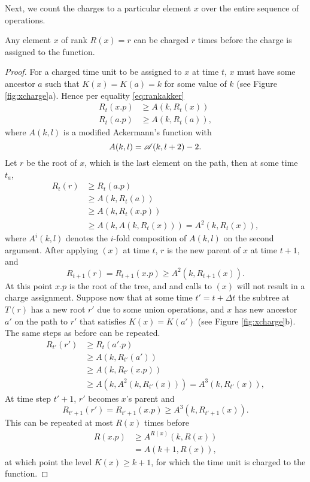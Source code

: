 Next, we count the charges to a particular element $x$ over the entire sequence of operations. 
\begin{lemma}\label{lem:xcharge}
  Any element $x$ of rank $R(x) = r$ can be charged $r$ times before the charge is assigned to the  function.
\end{lemma}
\begin{proof}
  For a charged time unit to be assigned to $x$ at time $t$, $x$ must have some ancestor $a$ such that $K(x) = K(a) = k$ for some value of $k$ (see Figure \ref{fig:xcharge}a). Hence per equality \ref{eq:rankakker}
  \begin{align*}
    R_{t}(x.p) & \geq A(k,R_{t}(x))\\
    R_{t}(a.p) & \geq A(k,R_{t}(a)),
  \end{align*}
  where $A(k,l)$ is a modified Ackermann's function with 
  \begin{equation*}
    A(k,l) = \mathscr{A}(k,l+2)-2.
  \end{equation*}
  Let $r$ be the root of $x$, which is the last element on the path, then at some time $t_a$,
  \begin{align*}
    R_{t}(r) &\geq R_{t}(a.p) \\
    &\geq A(k,R_{t}(a)) \\
    &\geq A(k,R_{t}(x.p)) \\
    &\geq A(k, A(k, R_{t}(x))) = A^2(k, R_{t}(x)),
  \end{align*}
  where $A^i(k,l)$ denotes the $i$-fold composition of $A(k,l)$ on the second argument. After applying $(x)$ at time $t$, $r$ is the new parent of $x$ at time $t+1$, and 
  \begin{equation*}
    R_{t+1}(r) = R_{t+1}(x.p) \geq A^2(k, R_{t+1}(x)).
  \end{equation*}
  At this point $x.p$ is the root of the tree, and and calls to $(x)$ will not result in a charge assignment. Suppose now that at some time $t' = t + \Delta t$ the subtree at $T(r)$ has a new root $r'$ due to some union operations, and $x$ has new ancestor $a'$ on the path to $r'$ that satisfies $K(x) = K(a')$ (see Figure \ref{fig:xcharge}b). The same steps as before can be repeated. 
  \begin{align*}
    R_{t'}(r') &\geq R_{t}(a'.p) \\
    &\geq A(k,R_{t'}(a')) \\
    &\geq A(k,R_{t'}(x.p)) \\
    &\geq A(k, A^2(k, R_{t'}(x))) = A^3(k, R_{t'}(x)),
  \end{align*}
  At time step $t'+1$, $r'$ becomes $x$'s parent and
  \begin{equation*}
    R_{t'+1}(r') = R_{t'+1}(x.p) \geq A^3(k, R_{t'+1}(x)).
  \end{equation*}
  This can be repeated at most $R(x)$ times before
  \begin{align*}
    R(x.p) &\geq A^{R(x)}(k,R(x)) \\
    &= A(k+1, R(x)),
  \end{align*}
  at which point the level $K(x)\geq k+1$, for which the time unit is charged to the  function. 
\end{proof}


